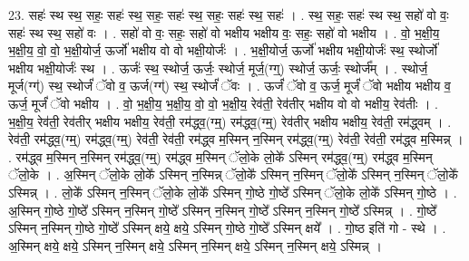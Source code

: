 \documentclass[17pt]{extarticle}
\begin{document}
23. सहः॑ स्थ स्थ॒ सहः॒ सहः॑ स्थ॒ सहः॒ सहः॑ स्थ॒ सहः॒ सहः॑ स्थ॒ सहः॑ । . स्थ॒ सहः॒ सहः॑ स्थ स्थ॒ सहो॑ वो वः॒ सहः॑ स्थ स्थ॒ सहो॑ वः । . सहो॑ वो वः॒ सहः॒ सहो॑ वो भक्षीय भक्षीय वः॒ सहः॒ सहो॑ वो भक्षीय । . वो॒ भ॒क्षी॒य॒ भ॒क्षी॒य॒ वो॒ वो॒ भ॒क्षी॒योर्ज॒ ऊर्जो॑ भक्षीय वो वो भक्षी॒योर्जः॑ । . भ॒क्षी॒योर्ज॒ ऊर्जो॑ भक्षीय भक्षी॒योर्जः॑ स्थ॒ स्थोर्जो॑ भक्षीय भक्षी॒योर्जः॑ स्थ । . ऊर्जः॑ स्थ॒ स्थोर्ज॒ ऊर्जः॒ स्थोर्ज॒ मूर्ज॒(ग्ग्॒) स्थोर्ज॒ ऊर्जः॒ स्थोर्ज᳚म् । . स्थोर्ज॒ मूर्ज(ग्ग्॑) स्थ॒ स्थोर्जं॑ ॅवो व॒ ऊर्ज(ग्ग्॑) स्थ॒ स्थोर्जं॑ ॅवः । . ऊर्जं॑ ॅवो व॒ ऊर्ज॒ मूर्जं॑ ॅवो भक्षीय भक्षीय व॒ ऊर्ज॒ मूर्जं॑ ॅवो भक्षीय । . वो॒ भ॒क्षी॒य॒ भ॒क्षी॒य॒ वो॒ वो॒ भ॒क्षी॒य॒ रेव॑ती॒ रेव॑तीर् भक्षीय वो वो भक्षीय॒ रेव॑तीः । . भ॒क्षी॒य॒ रेव॑ती॒ रेव॑तीर् भक्षीय भक्षीय॒ रेव॑ती॒ रम॑द्ध्व॒(ग्म्॒) रम॑द्ध्व॒(ग्म्॒) रेव॑तीर् भक्षीय भक्षीय॒ रेव॑ती॒ रम॑द्ध्वम् । . रेव॑ती॒ रम॑द्ध्व॒(ग्म्॒) रम॑द्ध्व॒(ग्म्॒) रेव॑ती॒ रेव॑ती॒ रम॑द्ध्व म॒स्मिन् न॒स्मिन् रम॑द्ध्व॒(ग्म्॒) रेव॑ती॒ रेव॑ती॒ रम॑द्ध्व म॒स्मिन्न् । . रम॑द्ध्व म॒स्मिन् न॒स्मिन् रम॑द्ध्व॒(ग्म्॒) रम॑द्ध्व म॒स्मिन् ॅलो॒के लो॒के᳚ ऽस्मिन् रम॑द्ध्व॒(ग्म्॒) रम॑द्ध्व म॒स्मिन् ॅलो॒के । . अ॒स्मिन् ॅलो॒के लो॒के᳚ ऽस्मिन् न॒स्मिन्न् ॅलो॒के᳚ ऽस्मिन् न॒स्मिन् ॅलो॒के᳚ ऽस्मिन् न॒स्मिन् ॅलो॒के᳚ ऽस्मिन्न् । . लो॒के᳚ ऽस्मिन् न॒स्मिन् ॅलो॒के लो॒के᳚ ऽस्मिन् गो॒ष्ठे गो॒ष्ठे᳚ ऽस्मिन् ॅलो॒के लो॒के᳚ ऽस्मिन् गो॒ष्ठे । . अ॒स्मिन् गो॒ष्ठे गो॒ष्ठे᳚ ऽस्मिन् न॒स्मिन् गो॒ष्ठे᳚ ऽस्मिन् न॒स्मिन् गो॒ष्ठे᳚ ऽस्मिन् न॒स्मिन् गो॒ष्ठे᳚ ऽस्मिन्न् । . गो॒ष्ठे᳚ ऽस्मिन् न॒स्मिन् गो॒ष्ठे गो॒ष्ठे᳚ ऽस्मिन् क्षये॒ क्षये॒ ऽस्मिन् गो॒ष्ठे गो॒ष्ठे᳚ ऽस्मिन् क्षये᳚ । . गो॒ष्ठ इति॑ गो - स्थे । . अ॒स्मिन् क्षये॒ क्षये॒ ऽस्मिन् न॒स्मिन् क्षये॒ ऽस्मिन् न॒स्मिन् क्षये॒ ऽस्मिन् न॒स्मिन् क्षये॒ ऽस्मिन्न् । \newline
\end{document}
